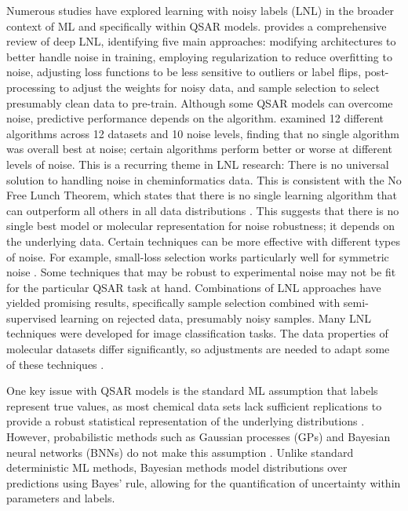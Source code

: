 \documentclass[pdflatex,sn-mathphys-num]{sn-jnl}%
\theoremstyle{thmstyleone}%
\theoremstyle{thmstyletwo}%
\theoremstyle{thmstylethree}%
\begin{document}
Numerous studies have explored learning with noisy labels (LNL) in the broader context of ML and specifically within QSAR models. \cite{Song2022} provides a comprehensive review of deep LNL, identifying five main approaches: modifying architectures to better handle noise in training, employing regularization to reduce overfitting to noise, adjusting loss functions to be less sensitive to outliers or label flips, post-processing to adjust the weights for noisy data, and sample selection to select presumably clean data to pre-train. Although some QSAR models can overcome noise, predictive performance depends on the algorithm. \cite{Cortes2015} examined 12 different algorithms across 12 datasets and 10 noise levels, finding that no single algorithm was overall best at noise; certain algorithms perform better or worse at different levels of noise. This is a recurring theme in LNL research: There is no universal solution to handling noise in cheminformatics data. This is consistent with the No Free Lunch Theorem, which states that there is no single learning algorithm that can outperform all others in all data distributions \citep{Wolpert1997}. This suggests that there is no single best model or molecular representation for noise robustness; it depends on the underlying data. Certain techniques can be more effective with different types of noise. For example, small-loss selection works particularly well for symmetric noise \citep{Song2022}. Some techniques that may be robust to experimental noise may not be fit for the particular QSAR task at hand. Combinations of LNL approaches have yielded promising results, specifically sample selection combined with semi-supervised learning on rejected data, presumably noisy samples. Many LNL techniques were developed for image classification tasks. The data properties of molecular datasets differ significantly, so adjustments are needed to adapt some of these techniques \citep{Song2022}.

One key issue with QSAR models is the standard ML assumption that labels represent true values, as most chemical data sets lack sufficient replications to provide a robust statistical representation of the underlying distributions \citep{Kolmar2021}. However, probabilistic methods such as Gaussian processes (GPs) and Bayesian neural networks (BNNs) do not make this assumption \citep{Kolmar2021}. Unlike standard deterministic ML methods, Bayesian methods model distributions over predictions using Bayes' rule, allowing for the quantification of uncertainty within parameters and labels.
\end{document}
